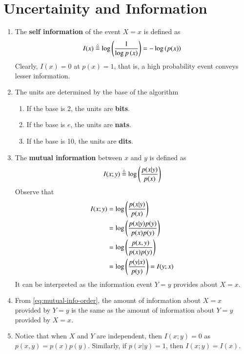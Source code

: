 \documentclass[journal,12pt,twocolumn]{IEEEtran}
\renewcommand\thesection{\arabic{section}}
\begin{document}
\section{Uncertainity and Information}
\begin{enumerate}[label=\thesection.\arabic*, ref=\thesection.\theenumi]
    \item The \textbf{self information} of the event $X = x$ 
    is defined as
    \begin{align}
        I(x) \stackrel{\triangle}{=} \log\left(\frac{1}{\log{p\ensuremath{\left(x\right)}}}\right) = -\log\left(p(x)\right)
        \label{eq:self-info}
    \end{align}
    Clearly, $I(x) = 0$ at $p(x) = 1$, that is, a high probability event conveys
    lesser information.
    \item The units are determined by the base of the algorithm
    \begin{enumerate}[label=\theenumi.\arabic*, ref=\theenumi.\arabic*]
        \item If the base is 2, the units are \textbf{bits}.
        \item If the base is $e$, the units are \textbf{nats}.
        \item If the base is 10, the units are \textbf{dits}.
    \end{enumerate}
    \item The \textbf{mutual information} between $x$ and $y$ 
    is defined as
    \begin{align}
        I(x;y) \stackrel{\triangle}{=} \log\left(\frac{p(x|y)}{p(x)}\right)
        \label{eq:mutual-info}
    \end{align}
    Observe that
    \begin{align}
        I(x;y) &= \log\left(\frac{p(x|y)}{p(x)}\right) \\
        &= \log\left(\frac{p(x|y)p(y)}{p(x)p(y)}\right) \\
        &= \log\left(\frac{p(x,y)}{p(x)p(y)}\right) \\
        &= \log\left(\frac{p(y|x)}{p(y)}\right) = I(y;x)
        \label{eq:mutual-info-order}
    \end{align}
    It can be interpreted as the information event $Y = y$ provides about
    $X = x$. 
    \item From \eqref{eq:mutual-info-order}, the amount of information about 
    $X = x$ provided by $Y = y$ is the same as the amount of information 
    about $Y = y$ provided by $X = x$.
    \item Notice that when $X$ and $Y$ are independent, then $I(x;y) = 0$ as 
    $p(x,y) = p(x)p(y)$. Similarly, if $p(x|y) = 1$, then $I(x;y) = I(x)$.

\end{enumerate}
\end{document}
